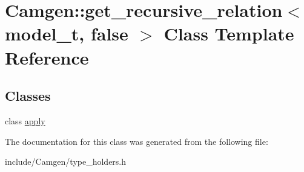 \hypertarget{a00251}{}\section{Camgen\+:\+:get\+\_\+recursive\+\_\+relation$<$ model\+\_\+t, false $>$ Class Template Reference}
\label{a00251}
\subsection*{Classes}
\begin{DoxyCompactItemize}
\item 
class \hyperlink{a00012}{apply}
\end{DoxyCompactItemize}


The documentation for this class was generated from the following file\+:\begin{DoxyCompactItemize}
\item 
include/\+Camgen/type\+\_\+holders.\+h\end{DoxyCompactItemize}

